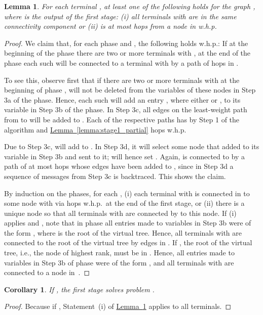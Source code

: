 \documentclass[letterpaper,11pt]{article}
\newtheorem{lemma}[theorem]{Lemma}
\newtheorem{corollary}[theorem]{Corollary}
\newcommand{\namedref}[2]{\hyperref[#2]{#1~\ref*{#2}}}
\newcommand{\lemmaref}[1]{\namedref{Lemma}{#1}}
\begin{document}
\begin{lemma}\label{lemma:stage1_connect}
For each terminal , at least one of the
following holds for the graph , where  is the output of the first
stage: (i) all terminals  with  are in the same
connectivity component or (ii)  is at most  hops
from a node in  w.h.p.
\end{lemma}
\begin{proof}
We claim that, for each phase  and ,
the following holds w.h.p.: If at the beginning of the phase there are two or
more terminals  with , at the end of the phase each such 
will be connected to a terminal  with  by a path of
 hops in . 

To see this, observe first that if there are two or more terminals  with
 at the beginning of phase ,  will not be deleted from
the  variables of these nodes in Step 3a of the phase. Hence, each such
 will add an entry , where either  or ,
to its  variable in Step 3b of the phase. In Step 3c, all edges on the
least-weight path from  to  will be added to . Each of the respective
paths has by Step 1 of the algorithm and \lemmaref{lemma:stage1_partial}
 hops w.h.p.

Due to Step 3c,  will add  to . In Step 3d, it will select
some node  that added  to its  variable in Step 3b and
sent  to it;  will hence set . Again,  is connected to  by a path of at most
 hops whose edges have been added to , since in Step
3d a sequence of messages from Step 3c is backtraced. This shows the claim.

By induction on the phases, for each , (i) each terminal  with  is connected in  to some node  with
 via  hops w.h.p.\ at the end of the first
stage, or (ii) there is a unique node so that all terminals  with
 are connected by  to this node. If (i) applies and
, note that in phase  all entries made to 
variables in Step 3b were of the form , where  is the root of
the virtual tree. Hence, all terminals  with  are
connected to the root of the virtual tree by edges in . If , the root of the virtual tree, i.e., the node of highest rank, must
be in . Hence, all entries made to  variables in Step 3b of
phase  were of the form , and all terminals 
with  are connected to a node in~.
\end{proof}

\begin{corollary}\label{coro:stage1_smalls_feasible}
If , the first stage solves problem .
\end{corollary}
\begin{proof}
Because  if , Statement~(i) of
\lemmaref{lemma:stage1_connect} applies to all terminals.
\end{proof}
\end{document}
